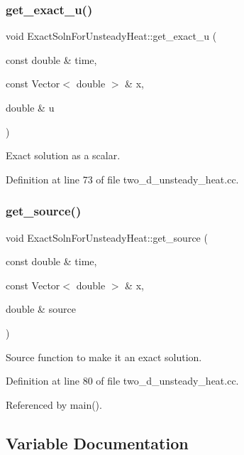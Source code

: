 \subsubsection{\texorpdfstring{get\+\_\+exact\+\_\+u()}{get\_exact\_u()}\hspace{0.1cm}{\footnotesize\ttfamily [2/2]}}
{\footnotesize\ttfamily void Exact\+Soln\+For\+Unsteady\+Heat\+::get\+\_\+exact\+\_\+u (\begin{DoxyParamCaption}\item[{const double \&}]{time,  }\item[{const Vector$<$ double $>$ \&}]{x,  }\item[{double \&}]{u }\end{DoxyParamCaption})}



Exact solution as a scalar. 



Definition at line 73 of file two\+\_\+d\+\_\+unsteady\+\_\+heat.\+cc.

\mbox{\label{namespaceExactSolnForUnsteadyHeat_ab4e853d6368b1fcdbd6205079687455a}} 
\subsubsection{\texorpdfstring{get\+\_\+source()}{get\_source()}}
{\footnotesize\ttfamily void Exact\+Soln\+For\+Unsteady\+Heat\+::get\+\_\+source (\begin{DoxyParamCaption}\item[{const double \&}]{time,  }\item[{const Vector$<$ double $>$ \&}]{x,  }\item[{double \&}]{source }\end{DoxyParamCaption})}



Source function to make it an exact solution. 



Definition at line 80 of file two\+\_\+d\+\_\+unsteady\+\_\+heat.\+cc.



Referenced by main().



\subsection{Variable Documentation}
\mbox{\label{namespaceExactSolnForUnsteadyHeat_a20d04bcf14546becd4bcdf45446be756}} 
